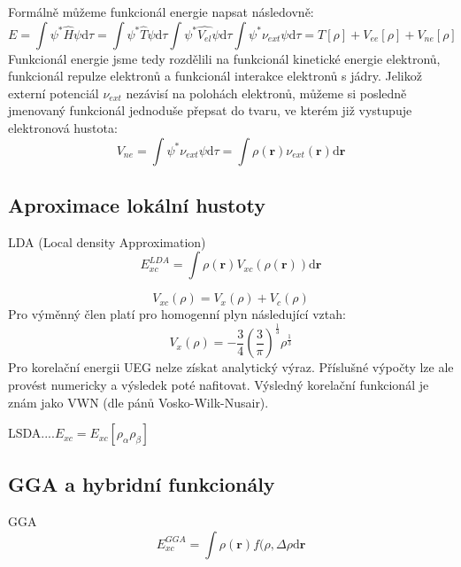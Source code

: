 Formálně můžeme funkcionál energie napsat následovně:
\begin{equation}
E=\int \psi^*\hat{H}\psi \mathrm{d}\tau = \int \psi^*\hat{T}\psi\mathrm{d}\tau \int \psi^*\hat{V_{el}}\psi\mathrm{d}\tau \int \psi^*\nu_{ext}\psi\mathrm{d}\tau=T[\rho]+V_{ee}[\rho]+V_{ne}[\rho]
\end{equation}
Funkcionál energie jsme tedy rozdělili na funkcionál kinetické energie elektronů, funkcionál repulze elektronů a funkcionál interakce elektronů s jádry. Jelikož externí potenciál $\nu_{ext}$ nezávisí na polohách elektronů, můžeme si posledně jmenovaný funkcionál jednoduše přepsat do tvaru, ve kterém již vystupuje elektronová hustota:
\begin{equation}
V_{ne}=\int \psi^*\nu_{ext}\psi\mathrm{d}\tau = \int \rho(\textbf{r})\nu_{ext}(\textbf{r}) \mathrm{d}\textbf{r} 
\end{equation} 




\subsection{Aproximace lokální hustoty}

LDA (Local density Approximation)
\begin{equation}
E_{xc}^{LDA}=\int \rho(\textbf{r})V_{xc}(\rho(\textbf{r}))\mathrm{d}\textbf{r} 
\end{equation}


\begin{equation}
V_{xc}(\rho)=V_x(\rho)+V_c(\rho)
\end{equation}
Pro výměnný člen platí pro homogenní plyn následující vztah:
\begin{equation}
V_x(\rho)=-\frac{3}{4}\left(\frac{3}{\pi}\right)^{\frac{1}{3}}\rho^{\frac{1}{3}}
\end{equation}
Pro korelační energii UEG nelze získat analytický výraz. Příslušné výpočty lze ale provést numericky a výsledek poté nafitovat. Výsledný korelační funkcionál je znám jako VWN (dle pánů Vosko-Wilk-Nusair).

LSDA....$E_{xc}=E_{xc}[\rho_\alpha\rho_\beta]$ 


\subsection{GGA a hybridní funkcionály}
GGA 
\begin{equation}
E_{xc}^{GGA}=\int \rho(\textbf{r})f(\rho,\Delta\rho\mathrm{d}\textbf{r} 
\end{equation}

